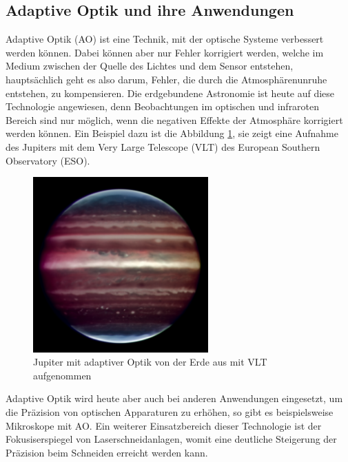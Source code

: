 \begin{refsection}
\section{Adaptive Optik und ihre Anwendungen}
Adaptive Optik (AO) ist eine Technik, mit der optische Systeme
verbessert werden können. Dabei können aber nur Fehler korrigiert
werden, welche im Medium zwischen der Quelle des Lichtes und dem Sensor
entstehen, hauptsächlich geht es also darum, Fehler, die durch die
Atmosphärenunruhe entstehen, zu kompensieren. Die erdgebundene Astronomie
ist heute auf diese Technologie angewiesen, denn Beobachtungen im
optischen und infraroten Bereich sind nur möglich, wenn die negativen
Effekte der Atmosphäre korrigiert werden können. Ein Beispiel dazu ist
die Abbildung \ref{fig:jupiter}, sie zeigt eine Aufnahme des Jupiters mit
dem Very Large Telescope (VLT) des European Southern Observatory (ESO).
%
%
%
%
\begin{figure}
  \centering
  \includegraphics[width=0.6\textwidth]{adaptiv/images/Jupiter_adaptiv}
  \caption{Jupiter mit adaptiver Optik von der Erde aus mit VLT aufgenommen
    \cite{eso:jupiter}}
  \label{fig:jupiter}
\end{figure}

Adaptive Optik wird heute aber auch bei anderen Anwendungen eingesetzt,
um die Präzision von optischen Apparaturen zu erhöhen, so gibt es
beispielsweise Mikroskope mit AO. Ein weiterer Einsatzbereich dieser
Technologie ist der Fokusiserspiegel von Laserschneidanlagen, womit eine
deutliche Steigerung der Präzision beim Schneiden erreicht werden kann.
%
%


\end{refsection}
